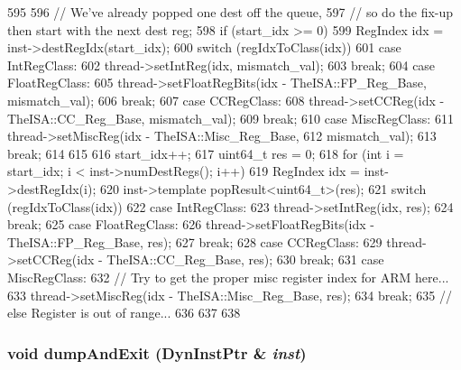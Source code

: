 \begin{DoxyCode}
595 {
596     // We've already popped one dest off the queue,
597     // so do the fix-up then start with the next dest reg;
598     if (start_idx >= 0) {
599         RegIndex idx = inst->destRegIdx(start_idx);
600         switch (regIdxToClass(idx)) {
601           case IntRegClass:
602             thread->setIntReg(idx, mismatch_val);
603             break;
604           case FloatRegClass:
605             thread->setFloatRegBits(idx - TheISA::FP_Reg_Base, mismatch_val);
606             break;
607           case CCRegClass:
608             thread->setCCReg(idx - TheISA::CC_Reg_Base, mismatch_val);
609             break;
610           case MiscRegClass:
611             thread->setMiscReg(idx - TheISA::Misc_Reg_Base,
612                                mismatch_val);
613             break;
614         }
615     }
616     start_idx++;
617     uint64_t res = 0;
618     for (int i = start_idx; i < inst->numDestRegs(); i++) {
619         RegIndex idx = inst->destRegIdx(i);
620         inst->template popResult<uint64_t>(res);
621         switch (regIdxToClass(idx)) {
622           case IntRegClass:
623             thread->setIntReg(idx, res);
624             break;
625           case FloatRegClass:
626             thread->setFloatRegBits(idx - TheISA::FP_Reg_Base, res);
627             break;
628           case CCRegClass:
629             thread->setCCReg(idx - TheISA::CC_Reg_Base, res);
630             break;
631           case MiscRegClass:
632             // Try to get the proper misc register index for ARM here...
633             thread->setMiscReg(idx - TheISA::Misc_Reg_Base, res);
634             break;
635             // else Register is out of range...
636         }
637     }
638 }
\end{DoxyCode}
\hypertarget{classChecker_a03be99814b51ddc0835a81391dd174e7}{
\subsubsection[{dumpAndExit}]{\setlength{\rightskip}{0pt plus 5cm}void dumpAndExit ({\bf DynInstPtr} \& {\em inst})}}
\label{classChecker_a03be99814b51ddc0835a81391dd174e7}



